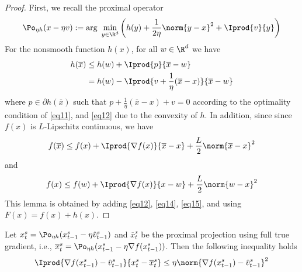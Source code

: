 \begin{proof}
First, we recall the proximal operator 
\begin{equation}\label{eq11}
\Po_{\eta h}(x-\eta v) := \text{arg}\,\,\min_{y\in\R^d}\left(h(y)+\frac{1}{2\eta}\norm{y-x}^2+\Iprod{v}{y}\right)
\end{equation}
For the nonsmooth function $h(x)$, for all $w\in\R^d$ we have 
\begin{equation}\label{eq12}
\begin{split}
h(\overline{x}) &\leq h(w) + \Iprod{p}{\overline{x}-w}\\
&= h(w) - \Iprod{v+\frac{1}{\eta}(\overline{x}-x)}{\overline{x}-w}
\end{split}
\end{equation}
where $p\in \partial h(\overline{x})$ such that $p+\frac{1}{\eta}(\overline{x}-x)+v = 0$ according to the optimality condition of \eqref{eq11}, and \eqref{eq12} due to the convexity of $h$. In addition, since since $f(x)$ is $L$-Lipschitz continuous, we have
\begin{equation}\label{eq14}
f(\overline{x}) \leq f(x)+\Iprod{\nabla f(x)}{\overline{x}-x}+\frac{L}{2}\norm{\overline{x}-x}^2
\end{equation}
and
\begin{equation}\label{eq15}
f(x) \leq f(w)+\Iprod{\nabla f(x)}{x-w}+\frac{L}{2}\norm{w-x}^2
\end{equation}
 This lemma is obtained by adding \eqref{eq12}, \eqref{eq14}, \eqref{eq15}, and using $F(x) = f(x)+h(x)$. 
\end{proof}
\begin{lemma}\label{lemm-est-grad}
Let  $x_{t}^s= \Po_{\eta h}(x_{t-1}^s - \eta \hat{v}_{t-1}^s)$ and $\overline{x}_{t}^s$ be the proximal projection using full true gradient, i.e., $\overline{x}_{t}^s= \Po_{\eta h}(x_{t-1}^s - \eta \nabla f(x_{t-1}^s))$. Then the following inequality holds
\[
\Iprod{\nabla f(x_{t-1}^s) -\hat{v}_{t-1}^s}{x_t^s -\overline{x}_t^s} \leq \eta\norm{\nabla f(x_{t-1}^s)-\hat{v}_{t-1}^s}^2
\]
\end{lemma}

